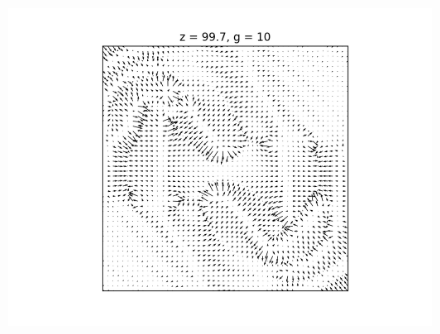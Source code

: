 \documentclass[a4paper,11pt]{article}
\begin{document}
\begin{figure}[!htb]
  \includegraphics[trim={4cm 0 0cm 0cm},scale=0.5]{vel_99_7_g10.png}
\endminipage\hfill


\end{figure}
\end{document}
